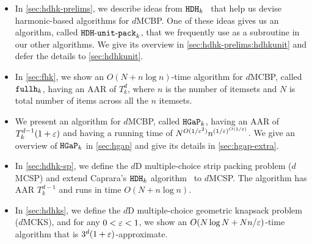 \begin{itemize}
\item In \cref{sec:hdhk-prelims}, we describe ideas from $\operatorname{\mathtt{HDH}}_{k}$~\cite{caprara2008}
    that help us devise harmonic-based algorithms for $d$MCBP.
    One of these ideas gives us an algorithm, called $\operatorname{\mathtt{HDH-unit-pack}}_k$,
    that we frequently use as a subroutine in our other algorithms.
    We give its overview in \cref{sec:hdhk-prelims:hdhkunit}
    and defer the details to \cref{sec:hdhkunit}.
\item In \cref{sec:fhk}, we show an $O(N + n\log n)$-time algorithm for $d$MCBP,
    called $\operatorname{\mathtt{fullh}}_k$, having an AAR of $T_k^d$, where $n$ is the number of itemsets
    and $N$ is total number of items across all the $n$ itemsets.
\item We present an algorithm for $d$MCBP, called $\operatorname{\mathtt{HGaP}}_k$, having an AAR of
    $T_k^{d-1}(1+\varepsilon)$ and having a running time of $N^{O(1/\varepsilon^2)}n^{(1/\varepsilon)^{O(1/\varepsilon)}}$.
    We give an overview of $\operatorname{\mathtt{HGaP}}_k$ in \cref{sec:hgap}
    and give its details in \cref{sec:hgap-extra}.
\item In \cref{sec:hdhk-sp}, we define the $d$D multiple-choice strip packing problem ($d$MCSP)
    and extend Caprara's $\operatorname{\mathtt{HDH}}_{k}$ algorithm~\cite{caprara2008} to $d$MCSP.
    The algorithm has AAR $T_k^{d-1}$ and runs in time $O(N + n\log n)$.
\item In \cref{sec:hdhks}, we define the $d$D multiple-choice geometric knapsack problem ($d$MCKS),
    and for any $0 < \varepsilon < 1$, we show an $O(N\log N + Nn/\varepsilon)$-time algorithm
    that is $3^d(1+\varepsilon)$-approximate.
\end{itemize}
